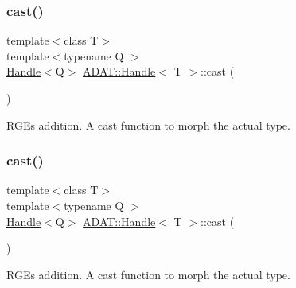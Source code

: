 \subsubsection{\texorpdfstring{cast()}{cast()}\hspace{0.1cm}{\footnotesize\ttfamily [2/3]}}
{\footnotesize\ttfamily template$<$class T$>$ \\
template$<$typename Q $>$ \\
\mbox{\hyperlink{classADAT_1_1Handle}{Handle}}$<$Q$>$ \mbox{\hyperlink{classADAT_1_1Handle}{A\+D\+A\+T\+::\+Handle}}$<$ T $>$\+::cast (\begin{DoxyParamCaption}{ }\end{DoxyParamCaption})\hspace{0.3cm}{\ttfamily [inline]}}



R\+GE\textquotesingle{}s addition. A cast function to morph the actual type. 

\mbox{\label{classADAT_1_1Handle_aac9634a0530419244ef076e63ff2b984}} 
\subsubsection{\texorpdfstring{cast()}{cast()}\hspace{0.1cm}{\footnotesize\ttfamily [3/3]}}
{\footnotesize\ttfamily template$<$class T$>$ \\
template$<$typename Q $>$ \\
\mbox{\hyperlink{classADAT_1_1Handle}{Handle}}$<$Q$>$ \mbox{\hyperlink{classADAT_1_1Handle}{A\+D\+A\+T\+::\+Handle}}$<$ T $>$\+::cast (\begin{DoxyParamCaption}{ }\end{DoxyParamCaption})\hspace{0.3cm}{\ttfamily [inline]}}



R\+GE\textquotesingle{}s addition. A cast function to morph the actual type. 

\mbox{\label{classADAT_1_1Handle_a86f851b3a2e8a6084e50bfad306260f4}} 
